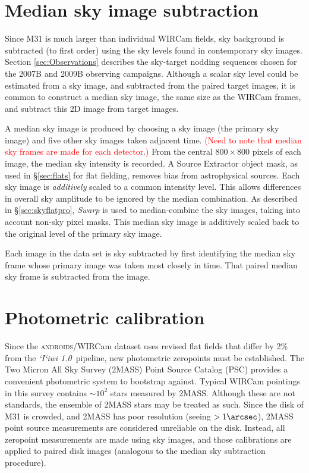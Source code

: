 \documentclass[iop]{emulateapj}
\newcommand{\sw}[1]{\textit{#1}} %
\newcommand{\iiwione}{\sw{`I`iwi 1.0}}
\newcommand{\androids}{\textsc{androids}}
\newcommand{\changeit}[1]{\textcolor{red}{#1}} %
\begin{document}
\section{Median sky image subtraction} %
\label{sec:mediansky}

Since M31 is much larger than individual WIRCam fields, sky background is subtracted (to first order) using the sky levels found in contemporary sky images. Section \ref{sec:Observations} describes the sky-target nodding sequences chosen for the 2007B and 2009B observing campaigns. Although a scalar sky level could be estimated from a sky image, and subtracted from the paired target images, it is common to construct a median sky image, the same size as the WIRCam frames, and subtract this 2D image from target images.

A median sky image is produced by choosing a sky image (the primary sky image) and five other sky images taken adjacent time. \changeit{(Need to note that median sky frames are made for each detector.)} From the central $800\times 800$ pixels of each image, the median sky intensity is recorded. A Source Extractor object mask, as used in \S \ref{sec:flats} for flat fielding, removes bias from astrophysical sources. Each sky image is \emph{additively} scaled to a common intensity level. This allows differences in overall sky amplitude to be ignored by the median combination. As described in \S \ref{sec:skyflatpro}, \sw{Swarp} is used to median-combine the sky images, taking into account non-sky pixel masks. This median sky image is additively scaled back to the original level of the primary sky image.

Each image in the data set is sky subtracted by first identifying the median sky frame whose primary image was taken most closely in time. That paired median sky frame is subtracted from the image.


\section{Photometric calibration}
\label{sec:photocal}

Since the \androids/WIRCam dataset uses revised flat fields that differ by 2\% from the \iiwione\ pipeline, new photometric zeropoints must be established.
The Two Micron All Sky Survey (2MASS) Point Source Catalog (PSC) \citep{Skrutskie:2006} provides a convenient photometric system to bootstrap against.
Typical WIRCam pointings in this survey contains $\sim 10^2$ stars measured by 2MASS.
Although these are not standards, the ensemble of 2MASS stars may be treated as such.
Since the disk of M31 is crowded, and 2MASS has poor resolution (seeing $> 1\arcsec$), 2MASS point source measurements are considered unreliable on the disk.
Instead, all zeropoint measurements are made using sky images, and those calibrations are applied to paired disk images (analogous to the median sky subtraction procedure).
\end{document}
